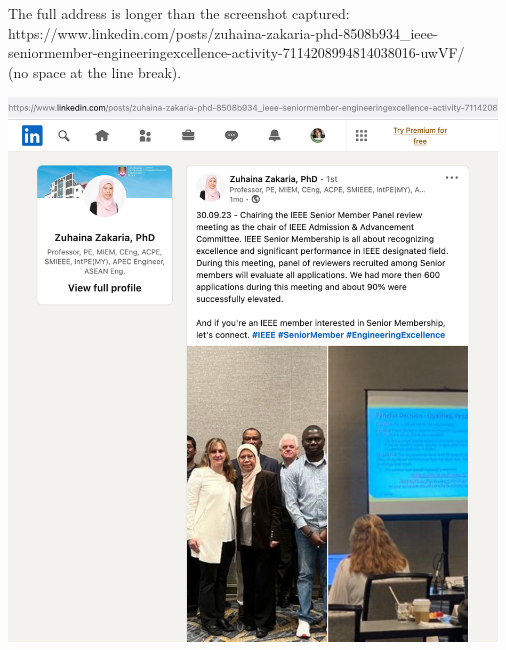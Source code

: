 
The full address is longer than the screenshot captured:
https://www.linkedin.com/posts/zuhaina-zakaria-phd-8508b934\_ieee-seniormember-engineeringexcellence-activity-7114208994814038016-uwVF/\\
(no space at the line break).

\begin{center}
    \includegraphics[width=35em]{zakaria-meeting}
\end{center}

\pagebreak
